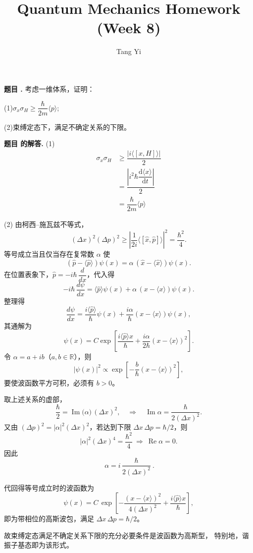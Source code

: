 \documentclass[12pt, a4paper, oneside]{ctexart}
\title{Quantum Mechanics Homework (Week 8)}
\author{Tang Yi \\ [学号已脱敏]}
\newcounter{problemname}
\newenvironment{problem}
  {\begin{shaded}\stepcounter{problemname}\par\noindent\textbf{题目 \theproblemname. }}
  {\end{shaded}\par}
\newenvironment{solution}
  {\par\noindent\textbf{题目 \theproblemname 的解答. }}
  {\par}
\begin{document}
\maketitle

\begin{problem}
  考虑一维体系，证明：

  (1)$\sigma_x \sigma_H \ge \dfrac{\hbar}{2m} \langle p \rangle$;

  (2)束缚定态下，满足不确定关系的下限。
\end{problem}

\begin{solution}
  (1)
  \begin{align*}
    \sigma_x \sigma_H &\ge \dfrac{|i \langle [x,H] \rangle|}{2}\\
    &= \dfrac{|i^2 \hbar \dfrac{\mathrm{d}\langle x \rangle}{\mathrm{d}t}|}{2} \\
    &= \dfrac{\hbar}{2m} \langle p \rangle
  \end{align*}

  (2)
  由柯西–施瓦兹不等式，
\[
(\Delta x)^2(\Delta p)^2 \ge 
\left|\frac{1}{2i}\langle[\hat x,\hat p]\rangle\right|^2
= \frac{\hbar^2}{4}.
\]
等号成立当且仅当存在复常数 $\alpha$ 使
\[
(\hat p - \langle \hat p\rangle)\psi(x)
= \alpha\,(\hat x - \langle \hat x\rangle)\psi(x).
\]
在位置表象下，$\hat p = -i\hbar\,\dfrac{d}{dx}$，代入得
\[
-i\hbar\,\frac{d\psi}{dx}
= \langle \hat p\rangle\psi(x)
+ \alpha\,(x-\langle x\rangle)\psi(x).
\]
整理得
\[
\frac{d\psi}{dx}
= \frac{i\langle \hat p\rangle}{\hbar}\psi(x)
+ \frac{i\alpha}{\hbar}(x-\langle x\rangle)\psi(x),
\]
其通解为
\[
\psi(x) = C
\exp\!\left[\frac{i\langle \hat p\rangle x}{\hbar}
+ \frac{i\alpha}{2\hbar}(x-\langle x\rangle)^2\right].
\]
令 $\alpha = a + ib$（$a,b\in\mathbb R$），则
\[
|\psi(x)|^2 \propto
\exp\!\left[-\frac{b}{\hbar}(x-\langle x\rangle)^2\right],
\]
要使波函数平方可积，必须有 $b>0$。

取上述关系的虚部，
\[
\frac{\hbar}{2}
= \operatorname{Im}\!\bigl(\alpha\bigr)\,(\Delta x)^2,
\quad\Rightarrow\quad
\operatorname{Im}\alpha = \frac{\hbar}{2(\Delta x)^2}.
\]
又由 $(\Delta p)^2 = |\alpha|^2(\Delta x)^2$，若达到下限
$\Delta x\,\Delta p = \hbar/2$，则
\[
|\alpha|^2(\Delta x)^4 = \frac{\hbar^2}{4}
\ \Rightarrow\
\operatorname{Re}\alpha = 0.
\]
因此
\[
\boxed{\ \alpha = i\,\frac{\hbar}{2(\Delta x)^2}\ }.
\]

代回得等号成立时的波函数为
\[
\boxed{
\psi(x)
= C\,
\exp\!\left[-\frac{(x-\langle x\rangle)^2}{4(\Delta x)^2}
+\frac{i\langle \hat p\rangle x}{\hbar}\right],
}
\]
即为带相位的高斯波包，满足
$\Delta x\,\Delta p = \hbar/2$。

故束缚定态满足不确定关系下限的充分必要条件是波函数为高斯型，
特别地，谐振子基态即为该形式。
\end{solution}
\end{document}
